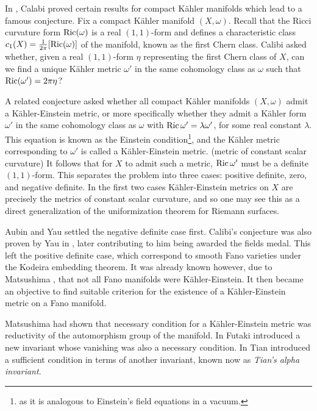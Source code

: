 In \cite{calabi54,calabi57}, Calabi proved certain results for compact K\"ahler manifolds which lead to a famous conjecture. Fix a compact K\"ahler manifold \((X,\omega)\). Recall that the Ricci curvature form \(\mathop{\rm Ric}\nolimits(\omega)\) is a real \((1,1)\)-form and defines a characteristic class \(c_1(X) = \frac{1}{2 \pi} [ \mathop{\rm Ric}\nolimits(\omega)] \) of the manifold, known as the first Chern class. Calibi asked whether, given a real \((1,1)\)-form \( \eta \) representing the first Chern class of \(X\), can we find a unique K\"ahler metric \(\omega'\) in the same cohomology class as \(\omega\) such that \(\mathop{\rm Ric}\nolimits(\omega') = 2 \pi \eta\)?

A related conjecture asked whether all compact K\"ahler manifolds \((X,\omega)\) admit a K\"ahler-Einstein metric, or more specifically whether they admit a K\"ahler form \(\omega'\) in the same cohomology class as \(\omega\) with \(\mathop{\rm Ric}\nolimits \omega' = \lambda \omega'\), for some real constant \(\lambda\). This equation is known as the Einstein condition\footnote{as it is analogous to Einstein's field equations in a vacuum.}, and the K\"ahler metric corresponding to \(\omega'\) is called a K\"ahler-Einstein metric. (metric of constant scalar curvature) It follows that for \(X\) to admit such a metric, \(\mathop{\rm Ric}\nolimits \omega'\) must be a definite \((1,1)\)-form. This separates the problem into three cases: positive definite, zero, and negative definite. In the first two cases K\"ahler-Einstein metrics on \(X\) are precisely the metrics of constant scalar curvature, and so one may see this as a direct generalization of the uniformization theorem for Riemann surfaces.

Aubin \cite{Aubin1976} and Yau \cite{Yau1977} settled the negative definite case first. Calibi's conjecture was also proven by Yau in \cite{Yau1977}, later contributing to him being awarded the fields medal. This left the positive definite case, which correspond to smooth Fano varieties under the Kodeira embedding theorem. It was already known however, due to Matsushima \cite{matsushima1957structure}, that not all Fano manifolds were K\"ahler-Einstein. It then became an objective to find suitable criterion for the existence of a K\"ahler-Einstein metric on a Fano manifold.

Matsushima had shown that necessary condition for a K\"ahler-Einstein metric was reductivity of the automorphism group of the manifold. In \cite{futaki1983obstruction} Futaki introduced a new invariant whose vanishing was also a necessary condition. In \cite{tian1987kahler} Tian introduced a sufficient condition in terms of another invariant, known now as \textit{Tian's alpha invariant}.

